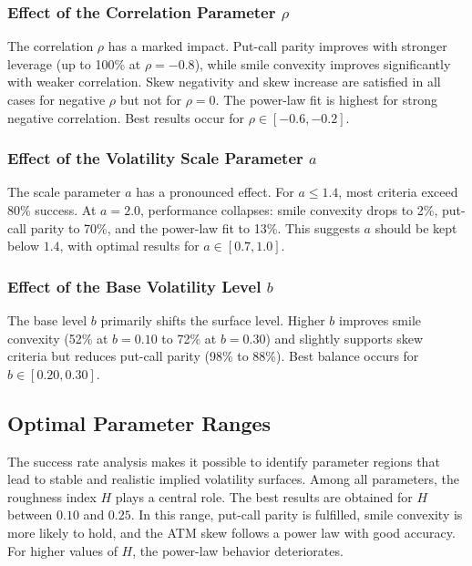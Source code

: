 \subsubsection*{Effect of the Correlation Parameter \texorpdfstring{$\rho$}{rho}}
The correlation $\rho$ has a marked impact. Put-call parity improves with stronger leverage (up to 100\% at $\rho=-0.8$), while smile convexity improves significantly with weaker correlation. Skew negativity and skew increase are satisfied in all cases for negative $\rho$ but not for $\rho=0$. The power-law fit is highest for strong negative correlation. Best results occur for $\rho \in [-0.6, -0.2]$.

\subsubsection*{Effect of the Volatility Scale Parameter \texorpdfstring{$a$}{a}}
The scale parameter $a$ has a pronounced effect. For $a \leq 1.4$, most criteria exceed 80\% success. At $a = 2.0$, performance collapses: smile convexity drops to 2\%, put-call parity to 70\%, and the power-law fit to 13\%. This suggests $a$ should be kept below $1.4$, with optimal results for $a \in [0.7, 1.0]$.

\subsubsection*{Effect of the Base Volatility Level \texorpdfstring{$b$}{b}}
The base level $b$ primarily shifts the surface level. Higher $b$ improves smile convexity (52\% at $b=0.10$ to 72\% at $b=0.30$) and slightly supports skew criteria but reduces put-call parity (98\% to 88\%). Best balance occurs for $b \in [0.20, 0.30]$.


\subsection{Optimal Parameter Ranges} \label{subsec:OptimalParameterRanges}

The success rate analysis makes it possible to identify parameter regions that lead to stable and realistic implied volatility surfaces. Among all parameters, the roughness index $H$ plays a central role. The best results are obtained for $H$ between $0.10$ and $0.25$. In this range, put-call parity is fulfilled, smile convexity is more likely to hold, and the ATM skew follows a power law with good accuracy. For higher values of $H$, the power-law behavior deteriorates.  

